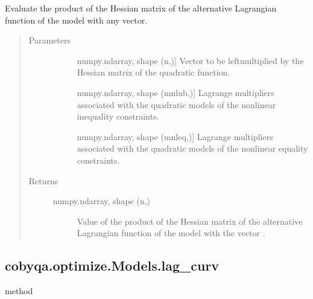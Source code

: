 \documentclass[letterpaper,10pt,english]{sphinxmanual}
\begin{document}
\begin{fulllineitems}
\begin{fulllineitems}
\label{\detokenize{refs/generated/cobyqa.optimize.Models.lag_alt_hessp:cobyqa.optimize.Models.lag_alt_hessp}}
\sphinxAtStartPar
Evaluate the product of the Hessian matrix of the alternative Lagrangian
function of the model with any vector.
\begin{quote}\begin{description}
\item[{Parameters}] \leavevmode\begin{description}
\item[{}] \leavevmode{[}numpy.ndarray, shape (n,){]}
\sphinxAtStartPar
Vector to be left\sphinxhyphen{}multiplied by the Hessian matrix of the quadratic
function.

\item[{}] \leavevmode{[}numpy.ndarray, shape (mnlub,){]}
\sphinxAtStartPar
Lagrange multipliers associated with the quadratic models of the
nonlinear inequality constraints.

\item[{}] \leavevmode{[}numpy.ndarray, shape (mnleq,){]}
\sphinxAtStartPar
Lagrange multipliers associated with the quadratic models of the
nonlinear equality constraints.

\end{description}

\item[{Returns}] \leavevmode\begin{description}
\item[{numpy.ndarray, shape (n,)}] \leavevmode
\sphinxAtStartPar
Value of the product of the Hessian matrix of the alternative
Lagrangian function of the model with the vector .

\end{description}

\end{description}\end{quote}

\end{fulllineitems}



\subsection{cobyqa.optimize.Models.lag\_curv}
\label{\detokenize{refs/generated/cobyqa.optimize.Models.lag_curv:cobyqa-optimize-models-lag-curv}}\label{\detokenize{refs/generated/cobyqa.optimize.Models.lag_curv::doc}}
\sphinxAtStartPar
method


\end{fulllineitems}
\end{document}
